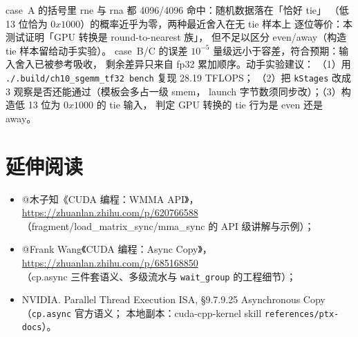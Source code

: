 case~A 的括号里 rne 与 rna 都 4096/4096 命中：随机数据落在「恰好 tie」
（低 13 位恰为 $0x1000$）的概率近乎为零，两种最近舍入在无 tie 样本上
逐位等价：本测试证明「GPU 转换是 round-to-nearest 族」，
但不足以区分 even/away（构造 tie 样本留给动手实验）。
case~B/C 的误差 $10^{-5}$ 量级远小于容差，符合预期：输入舍入已被参考吸收，
剩余差异只来自 fp32 累加顺序。动手实验建议：
（1）用 \texttt{.\allowbreak{}/\allowbreak{}.\allowbreak{}build/\allowbreak{}ch10\_\allowbreak{}sgemm\_\allowbreak{}tf32 bench} 复现 28.19 TFLOPS；
（2）把 \texttt{kStages} 改成 3 观察是否还能通过（模板会多占一级 smem，
launch 字节数须同步改）；（3）构造低 13 位为 $0x1000$ 的 tie 输入，
判定 GPU 转换的 tie 行为是 even 还是 away。

\section*{延伸阅读}

\begin{itemize}
  \item @木子知《CUDA 编程：WMMA API》，\\
        \url{https://zhuanlan.zhihu.com/p/620766588}\\
        （fragment/load\_matrix\_sync/mma\_sync 的 API 级讲解与示例）；
  \item @Frank Wang《CUDA 编程：Async Copy》，\\
        \url{https://zhuanlan.zhihu.com/p/685168850}\\
        （cp.async 三件套语义、多级流水与 \texttt{wait\_group} 的工程细节）；
  \item NVIDIA. Parallel Thread Execution ISA, §9.7.9.25
        Asynchronous Copy（\texttt{cp.async} 官方语义；
        本地副本：cuda-cpp-kernel skill \texttt{references/\allowbreak{}ptx-docs}）。
\end{itemize}
